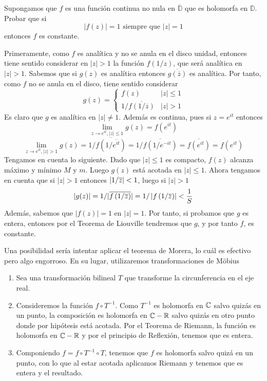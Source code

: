 \documentclass[twoside]{article}
\begin{document}
\begin{ejercicio}{9}
Supongamos que $f$ es una función continua no nula en $\overline{\mathbb{D}}$ que es holomorfa en $\mathbb{D}$. Probar que si 
$$
|f(z)|=1 \text{ siempre que } |z|=1
$$
entonces $f$ es constante.
\end{ejercicio}
\begin{solucion}
Primeramente, como $f$ es analítica y no se anula en el disco unidad, entonces tiene sentido considerar en $|z|>1$ la función $f(1/z)$, que será analítica en $|z|>1$. Sabemos que si $g(z)$ es analítica entonces $\overline{g(\overline{z})}$ es analítica.  Por tanto, como $f$ no se anula en el disco, tiene sentido considerar
$$
g(z)=
\begin{cases}
f(z) & |z|\leq 1\\
1/\overline{f\left({1}/{\overline{z}}\right)} & |z|>1
\end{cases}
$$
Es claro que $g$ es analítica en $|z|\neq 1$. Además es continua, pues si $z= e^{it}$ entonces
$$
\lim_{z\to e^{it},|z|\leq 1}g(z)=f(e^{it})
$$
$$
\lim_{z\to e^{it},|z|>1}g(z)=1/\overline{f(1/\overline{e^{it}})} = 1/\overline{f(1/e^{-it})}=\overline{f(e^{it})} = f(e^{it})
$$ Tengamos en cuenta lo siguiente. Dado que $|z|\leq 1$ es compacto, $f(z)$ alcanza máximo y mínimo $M$ y $m$. Luego $g(z)$ está acotada en $|z|\leq 1$. Ahora tengamos en cuenta que si $|z|>1$ entonces $\left\lvert1/\overline{z}\right\rvert<1$, luego si $|z|>1$
$$|g(z)| = 1/|\overline{f\left({1}/{\overline{z}}\right)}| = 1/\left\lvert f\left({1}/{\overline{z}}\right)\right\rvert<\frac{1}{S}
$$
Además, sabemos que $|f(z)|=1$ en $|z|=1$. Por tanto, si probamos que $g$ es entera, entonces por el Teorema de Liouville tendremos que $g$, y por tanto $f$, es constante.

Una posibilidad sería intentar aplicar el teorema de Morera, lo cuál es efectivo pero algo engorroso. En su lugar, utilizaremos transformaciones de Möbius 
\begin{enumerate}
\item Sea una transformación bilineal $T$ que transforme la circunferencia en el eje real. 
\item Consideremos la función $f \circ T^{-1}$. Como $T^{-1}$ es holomorfa en $\mathbb{C}$ salvo quizás en un punto, la composición es holomorfa en $\mathbb{C}- \mathbb{R}$ salvo quizás en otro punto donde por hipótesis está acotada. Por el Teorema de Riemann, la función es holomorfa en $\mathbb{C}-\mathbb{R}$ y por el principio de Reflexión, tenemos que es entera. 
\item Componiendo $f = f \circ T^{-1} \circ T$, tenemos que $f$ es holomorfa salvo quizá en un punto, con lo que al estar acotada aplicamos Riemann y tenemos que es entera y el resultado.
\end{enumerate}
\end{solucion}
\newpage
\end{document}
